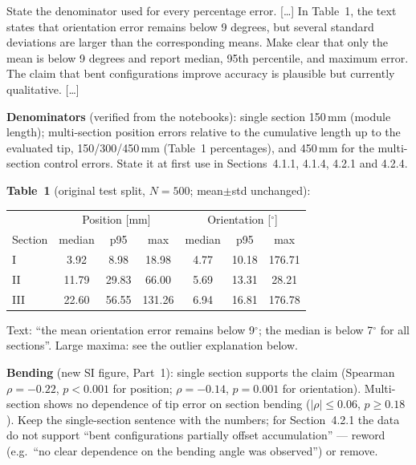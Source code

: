 \documentclass[10pt,a4paper]{article}
\begin{document}
\begin{rev}
State the denominator used for every percentage error. [\dots] In Table~1, the text states that orientation error remains below 9 degrees, but several standard deviations are larger than the corresponding means. Make clear that only the mean is below 9 degrees and report median, 95th percentile, and maximum error. The claim that bent configurations improve accuracy is plausible but currently qualitative. [\dots]
\end{rev}
\begin{todo}
\textbf{Denominators} (verified from the notebooks): single section 150\,mm (module length); multi-section position errors relative to the cumulative length up to the evaluated tip, 150/300/450\,mm (Table~1 percentages), and 450\,mm for the multi-section control errors. State it at first use in Sections~4.1.1, 4.1.4, 4.2.1 and 4.2.4.

\textbf{Table~1} (original test split, $N=500$; mean$\pm$std unchanged):
\begin{center}\small
\begin{tabular}{lcccccc}
\toprule
& \multicolumn{3}{c}{Position [mm]} & \multicolumn{3}{c}{Orientation [$^\circ$]}\\
Section & median & p95 & max & median & p95 & max\\\midrule
I & 3.92 & 8.98 & 18.98 & 4.77 & 10.18 & 176.71\\
II & 11.79 & 29.83 & 66.00 & 5.69 & 13.31 & 28.21\\
III & 22.60 & 56.55 & 131.26 & 6.94 & 16.81 & 176.78\\
\bottomrule
\end{tabular}
\end{center}
Text: ``the mean orientation error remains below 9$^\circ$; the median is below 7$^\circ$ for all sections''. Large maxima: see the outlier explanation below.

\textbf{Bending} (new SI figure, Part~1): single section supports the claim (Spearman $\rho=-0.22$, $p<0.001$ for position; $\rho=-0.14$, $p=0.001$ for orientation). Multi-section shows no dependence of tip error on section bending ($|\rho|\le0.06$, $p\ge0.18$). Keep the single-section sentence with the numbers; for Section~4.2.1 the data do not support ``bent configurations partially offset accumulation'' --- reword (e.g.\ ``no clear dependence on the bending angle was observed'') or remove.
\end{todo}
\end{document}
